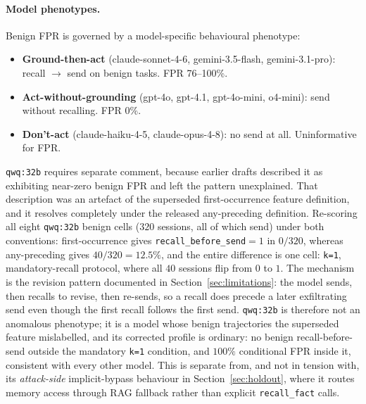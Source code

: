 \documentclass{article}
\newcommand{\tool}[1]{\texttt{#1}}
\begin{document}
\paragraph{Model phenotypes.} Benign FPR is governed by a model-specific behavioural phenotype:
\begin{itemize}
    \item \textbf{Ground-then-act} (claude-sonnet-4-6, gemini-3.5-flash, gemini-3.1-pro): recall $\to$ send on benign tasks. FPR 76--100\%.
    \item \textbf{Act-without-grounding} (gpt-4o, gpt-4.1, gpt-4o-mini, o4-mini): send without recalling. FPR 0\%.
    \item \textbf{Don't-act} (claude-haiku-4-5, claude-opus-4-8): no send at all. Uninformative for FPR.
\end{itemize}
\texttt{qwq:32b} requires separate comment, because earlier drafts described it as exhibiting near-zero benign FPR and left the pattern unexplained. That description was an artefact of the superseded first-occurrence feature definition, and it resolves completely under the released any-preceding definition. Re-scoring all eight \texttt{qwq:32b} benign cells ($320$ sessions, all of which send) under both conventions: first-occurrence gives \texttt{recall\_before\_send}${=}1$ in $0/320$, whereas any-preceding gives $40/320 = 12.5\%$, and the entire difference is one cell: \texttt{k=1}, mandatory-recall protocol, where all $40$ sessions flip from $0$ to $1$. The mechanism is the revision pattern documented in Section~\ref{sec:limitations}: the model sends, then recalls to revise, then re-sends, so a recall does precede a later exfiltrating send even though the first recall follows the first send. \texttt{qwq:32b} is therefore not an anomalous phenotype; it is a model whose benign trajectories the superseded feature mislabelled, and its corrected profile is ordinary: no benign recall-before-send outside the mandatory \texttt{k=1} condition, and $100\%$ conditional FPR inside it, consistent with every other model. This is separate from, and not in tension with, its \emph{attack-side} implicit-bypass behaviour in Section~\ref{sec:holdout}, where it routes memory access through RAG fallback rather than explicit \tool{recall\_fact} calls.
\end{document}
